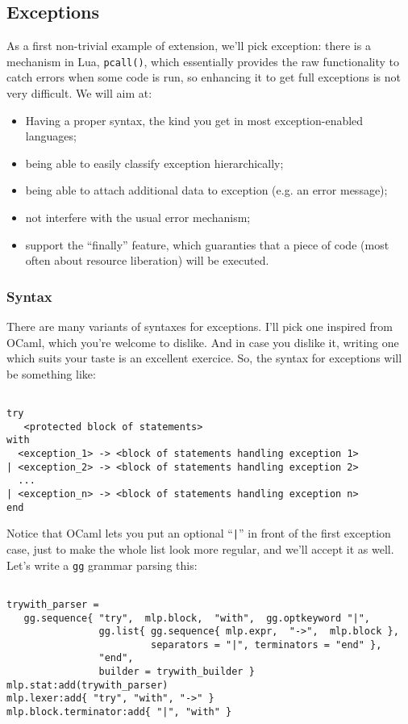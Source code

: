 \subsection{Exceptions}
As a first non-trivial example of extension, we'll pick exception:
there is a mechanism in Lua, {\tt pcall()}, which essentially provides
the raw functionality to catch errors when some code is run, so
enhancing it to get full exceptions is not very difficult. We will aim
at:
\begin{itemize}
\item Having a proper syntax, the kind you get in most
  exception-enabled languages;
\item being able to easily classify exception hierarchically;
\item being able to attach additional data to exception (e.g. an error
  message);
\item not interfere with the usual error mechanism;
\item support the ``finally'' feature, which guaranties that a piece
  of code (most often about resource liberation) will be executed.
\end{itemize}

\subsubsection{Syntax}
There are many variants of syntaxes for exceptions. I'll pick one
inspired from OCaml, which you're welcome to dislike. And in case you
dislike it, writing one which suits your taste is an excellent
exercice. So, the syntax for exceptions will be something like:
\begin{Verbatim}[fontsize=\scriptsize]

try
   <protected block of statements>
with
  <exception_1> -> <block of statements handling exception 1>
| <exception_2> -> <block of statements handling exception 2>
  ...
| <exception_n> -> <block of statements handling exception n>
end
\end{Verbatim}

Notice that OCaml lets you put an optional ``{\tt|}'' in front of the
first exception case, just to make the whole list look more regular,
and we'll accept it as well. Let's write a {\tt gg} grammar parsing
this:

\begin{Verbatim}[fontsize=\scriptsize]

trywith_parser = 
   gg.sequence{ "try",  mlp.block,  "with",  gg.optkeyword "|",
                gg.list{ gg.sequence{ mlp.expr,  "->",  mlp.block },
                         separators = "|", terminators = "end" },
                "end", 
                builder = trywith_builder }
mlp.stat:add(trywith_parser)
mlp.lexer:add{ "try", "with", "->" }
mlp.block.terminator:add{ "|", "with" }
\end{Verbatim}

